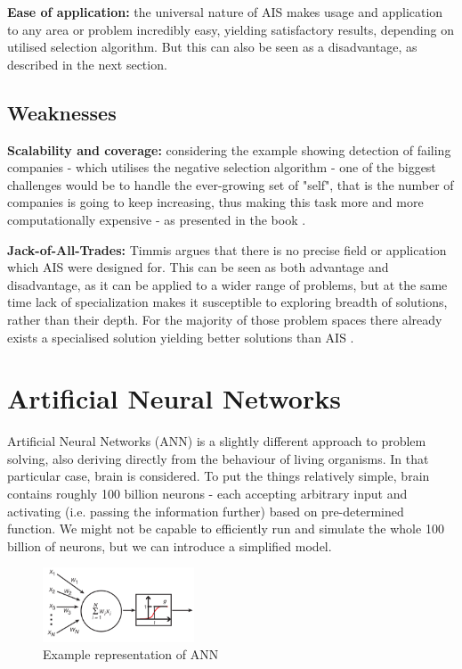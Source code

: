 \documentclass[letterpaper, 10 pt, conference]{ieeeconf}  %
\begin{document}
\textbf{Ease of application:} the universal nature of AIS makes usage and application to any area or problem incredibly easy, yielding satisfactory results, depending on utilised selection algorithm. But this can also be seen as a disadvantage, as described in the next section.

\subsection{Weaknesses}
\textbf{Scalability and coverage:} considering the example showing detection of failing companies - which utilises the negative selection algorithm - one of the biggest challenges would be to handle the ever-growing set of "self", that is the number of companies is going to keep increasing, thus making this task more and more computationally expensive - as presented in the book \cite{brabazon2006biologically}.

\textbf{Jack-of-All-Trades:} Timmis argues \cite{timmis2004overview} that there is no precise field or application which AIS were designed for. This can be seen as both advantage and disadvantage, as it can be applied to a wider range of problems, but at the same time lack of specialization makes it susceptible to exploring breadth of solutions, rather than their depth. For the majority of those problem spaces there already exists a specialised solution yielding better solutions than AIS \cite{garrett2005we}.

\section{Artificial Neural Networks}
Artificial Neural Networks (ANN) is a slightly different approach to problem solving, also deriving directly from the behaviour of living organisms. In that particular case, brain is considered. To put the things relatively simple, brain contains roughly 100 billion neurons \cite{lent2012many} - each accepting arbitrary input and activating (i.e. passing the information further) based on pre-determined function. We might not be capable to efficiently run and simulate the whole 100 billion of neurons, but we can introduce a simplified model.

\begin{figure}[h!]
  \centering
  \includegraphics[width=0.4\textwidth]{ann}
  \caption{Example representation of ANN \cite{krogh2008artificial}}
  \label{fig:ann}
\end{figure}
\end{document}
